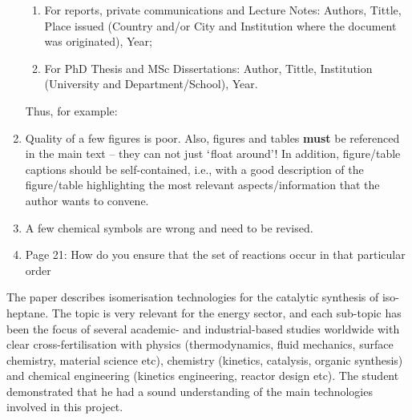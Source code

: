 \documentclass[14pt,twoside]{report}
\begin{document}
\begin{enumerate}
\begin{enumerate}
\item For reports,  private communications and Lecture Notes: Authors, Tittle, Place issued (Country and/or City and Institution where the document was originated), Year;
\item For PhD Thesis and MSc Dissertations: Author, Tittle, Institution (University and Department/School), Year.
\end{enumerate}  
Thus, for example:
%
\item Quality of a few figures is poor. Also, figures and tables {\bf must} be referenced in the main text -- they can not just $\lq$float around'! In addition, figure/table captions should be self-contained, i.e., with a good description of the figure/table highlighting the most relevant aspects/information that the author wants to convene. 
% 
\item A few chemical symbols are wrong and need to be revised.
%
\item Page 21: How do you ensure that the set of reactions occur in that particular order
%
\end{enumerate}

The paper describes isomerisation technologies for the catalytic synthesis of iso-heptane. The topic is very relevant for the energy sector, and each sub-topic has been the focus of several academic- and industrial-based studies worldwide with clear cross-fertilisation with physics (thermodynamics, fluid mechanics, surface chemistry, material science etc), chemistry (kinetics, catalysis, organic synthesis) and chemical engineering (kinetics engineering, reactor design etc). The student demonstrated that he had a sound understanding of the main technologies involved in this project.
\end{document}
